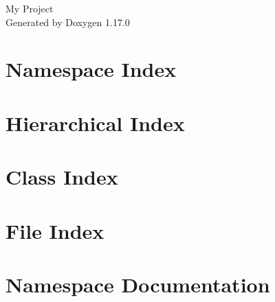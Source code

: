 \documentclass[twoside]{book}
\newcommand{\+}{\discretionary{\mbox{\scriptsize$\hookleftarrow$}}{}{}}
\newcommand{\clearemptydoublepage}{%
    \newpage{\pagestyle{empty}\cleardoublepage}%
  }
\begin{document}
  \raggedbottom
    \hypersetup{pageanchor=false,
                bookmarksnumbered=true,
                pdfencoding=unicode
               }
  \begin{titlepage}
  \vspace*{7cm}
  \begin{center}%
  {\Large My Project}\\
  \vspace*{1cm}
  {\large Generated by Doxygen 1.17.0}\\
  \end{center}
  \end{titlepage}
  \clearemptydoublepage
  \tableofcontents
  \clearemptydoublepage
  \hypersetup{pageanchor=true}

\chapter{Namespace Index}

\chapter{Hierarchical Index}

\chapter{Class Index}

\chapter{File Index}

\chapter{Namespace Documentation}

\end{document}
